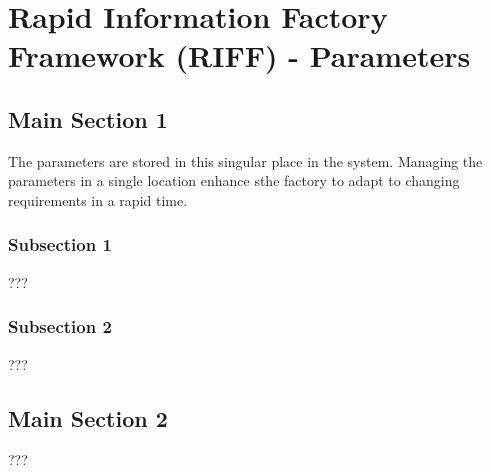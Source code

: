 
\chapter{Rapid Information Factory Framework (RIFF) - Parameters} %

\label{Chapter24} %



\section{Main Section 1}

The parameters are stored in this singular place in the system. Managing the parameters in a single location enhance sthe factory to adapt to changing requirements in a rapid time.

\subsection{Subsection 1}

???


\subsection{Subsection 2}

???


\section{Main Section 2}

???
